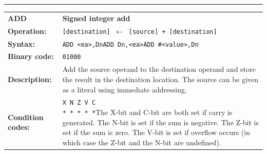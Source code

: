 \documentclass[]{article}
\begin{document}
\begin{appendices}
\noindent\rule{10cm}{1pt}\newline %
\setlength\extrarowheight{5pt} %
\begin{tabularx}{\textwidth}{lL}
  {\Large \textbf{ADD}} 	& {\Large \textbf{Signed integer add}}\\
  \textbf{Operation:} 		& \texttt{[destination] $\leftarrow$ [source] + [destination]}\\
  \textbf{Syntax:}  		& \texttt{ADD <ea>,Dn}\newline\texttt{ADD Dn,<ea>}\newline\texttt{ADD \#<value>,Dn}\\
  \textbf{Binary code:} 	& \texttt{01000}\\
  \textbf{Description:}  	& Add the source operand to the destination operand and store the
result in the destination location. The source can be given as a literal using immediate addressing.\\
  \textbf{Condition codes:} & \texttt{X N Z V C\newline * * * * *}\newline\newline The X-bit and C-bit are both set if carry is generated. The N-bit is set if the sum is negative. The Z-bit is set if the sum is zero. The V-bit is set if overflow occurs (in which case the Z-bit and the N-bit are undefined).\\
\end{tabularx}
\newline


\end{appendices}
\end{document}
